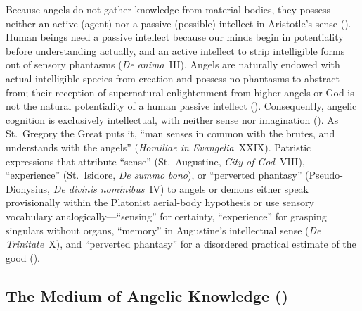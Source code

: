 Because angels do not gather knowledge from material bodies, they possess neither an active (agent) nor a passive (possible) intellect in Aristotle's sense (). Human beings need a passive intellect because our minds begin in potentiality before understanding actually, and an active intellect to strip intelligible forms out of sensory phantasms (\emph{De anima}~III). Angels are naturally endowed with actual intelligible species from creation and possess no phantasms to abstract from; their reception of supernatural enlightenment from higher angels or God is not the natural potentiality of a human passive intellect (). Consequently, angelic cognition is exclusively intellectual, with neither sense nor imagination (). As St.~Gregory the Great puts it, ``man senses in common with the brutes, and understands with the angels'' (\emph{Homiliae in Evangelia}~XXIX). Patristic expressions that attribute ``sense'' (St.~Augustine, \emph{City of God}~VIII), ``experience'' (St.~Isidore, \emph{De summo bono}), or ``perverted phantasy'' (Pseudo-Dionysius, \emph{De divinis nominibus}~IV) to angels or demons either speak provisionally within the Platonist aerial-body hypothesis or use sensory vocabulary analogically---``sensing'' for certainty, ``experience'' for grasping singulars without organs, ``memory'' in Augustine's intellectual sense (\emph{De Trinitate}~X), and ``perverted phantasy'' for a disordered practical estimate of the good ().


\subsection{The Medium of Angelic Knowledge ()}

